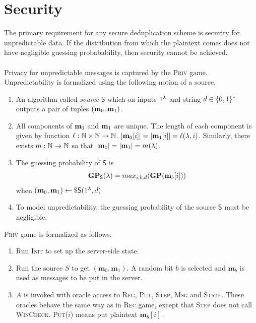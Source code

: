 	\section{Security}
	\label{subsec:security}
	The primary requirement for any secure deduplication scheme is security for unpredictable data. If the distribution from which the plaintext comes does not have negligible guessing probabability, then security cannot be achieved.\\ \\
	Privacy for unpredictable messages is captured by the \textsc{Priv} game. Unpredictability is formalized using the following notion of a source.
	\begin{enumerate}
		\item An algorithm called \textit{source} $\mathsf{S}$ which on inputs $1^{\lambda}$ and string $d \in \{0,1\}^*$ outputs a pair of tuples $(\textbf{m}_0, \textbf{m}_1)$.
		\item All components of $\textbf{m}_0$ and $\textbf{m}_1$ are unique. The length of each component is given by function $\ell : \mathbb{N} \times \mathbb{N} \rightarrow \mathbb{N} $. $|\textbf{m}_0[i]| = |\textbf{m}_1[i]| = \ell(\lambda, i)$. Similarly, there exists $m: \mathbb{N} \rightarrow \mathbb{N} $ so that $|\textbf{m}_0| = |\textbf{m}_1|= m (\lambda)$.
		\item The guessing probability of $\mathsf{S}$ is
		\begin{equation*}
		\textbf{GP}_\mathsf{S}(\lambda) = max_{i,b,d}(\textbf{GP}(\textbf{m}_b[i]))
		\end{equation*}
		when $(\textbf{m}_0, \textbf{m}_1) \leftarrow \$ \mathsf{S}(1^{\lambda}, d)$
		\item To model unpredictability, the guessing probability of the source $\mathsf{S}$ must be negligible.
	\end{enumerate}
	\textsc{Priv} game is formalized as follows.
	\begin{enumerate}
		\item Run \textsc{Init} to set up the server-side state.
		\item Run the source $S$ to get $(\textbf{m}_0, \textbf{m}_1)$. A random bit $b$ is selected and $\textbf{m}_b$ is used as messages to be put in the server.
		\item $A$ is invoked with oracle access to \textsc{Reg, Put, Step, Msg} and \textsc{State}. These oracles behave the same way as in \textsc{Rec} game, except that \textsc{Step} does not call \textsc{WinCheck}. \textsc{Put}($i$) means put plaintext $\textbf{m}_b[i]$.
	\end{enumerate}     
	


